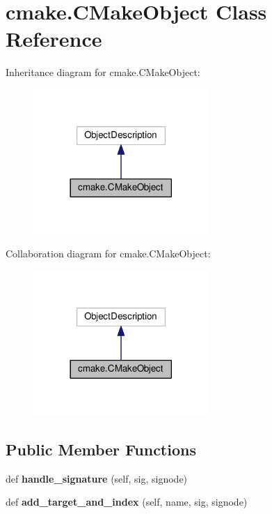 \hypertarget{classcmake_1_1CMakeObject}{}\section{cmake.\+C\+Make\+Object Class Reference}
\label{classcmake_1_1CMakeObject}


Inheritance diagram for cmake.\+C\+Make\+Object\+:
\nopagebreak
\begin{figure}[H]
\begin{center}
\leavevmode
\includegraphics[width=189pt]{classcmake_1_1CMakeObject__inherit__graph}
\end{center}
\end{figure}


Collaboration diagram for cmake.\+C\+Make\+Object\+:
\nopagebreak
\begin{figure}[H]
\begin{center}
\leavevmode
\includegraphics[width=189pt]{classcmake_1_1CMakeObject__coll__graph}
\end{center}
\end{figure}
\subsection*{Public Member Functions}
\begin{DoxyCompactItemize}
\item 
def {\bfseries handle\+\_\+signature} (self, sig, signode)\hypertarget{classcmake_1_1CMakeObject_a315ae4a1d65f1d45f0e77e146b31e80e}{}\label{classcmake_1_1CMakeObject_a315ae4a1d65f1d45f0e77e146b31e80e}

\item 
def {\bfseries add\+\_\+target\+\_\+and\+\_\+index} (self, name, sig, signode)\hypertarget{classcmake_1_1CMakeObject_a482e03d79771bd8937a47022b493f8bf}{}\label{classcmake_1_1CMakeObject_a482e03d79771bd8937a47022b493f8bf}

\end{DoxyCompactItemize}
